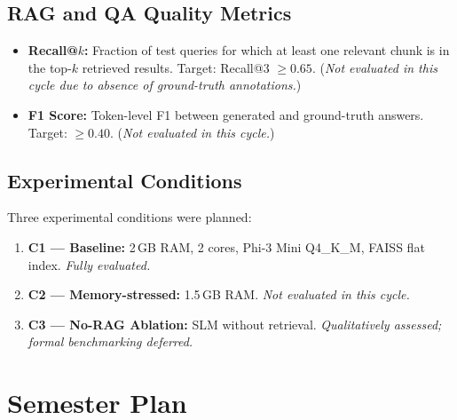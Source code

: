 \documentclass[10pt,twocolumn]{article}
\begin{document}
\subsection{RAG and QA Quality Metrics}

\begin{itemize}[leftmargin=*,itemsep=2pt]
  \item \textbf{Recall@$k$:} Fraction of test queries for which at least one relevant chunk is in the top-$k$ retrieved results. Target: Recall@3 $\geq 0.65$. (\textit{Not evaluated in this cycle due to absence of ground-truth annotations.})
  \item \textbf{F1 Score:} Token-level F1 between generated and ground-truth answers. Target: $\geq 0.40$. (\textit{Not evaluated in this cycle.})
\end{itemize}

\subsection{Experimental Conditions}

Three experimental conditions were planned:

\begin{enumerate}[leftmargin=*,itemsep=2pt]
  \item \textbf{C1 — Baseline:} 2\,GB RAM, 2 cores, Phi-3 Mini Q4\_K\_M, FAISS flat index. \textit{Fully evaluated.}
  \item \textbf{C2 — Memory-stressed:} 1.5\,GB RAM. \textit{Not evaluated in this cycle.}
  \item \textbf{C3 — No-RAG Ablation:} SLM without retrieval. \textit{Qualitatively assessed; formal benchmarking deferred.}
\end{enumerate}

\section{Semester Plan}
\label{sec:plan}
\end{document}
